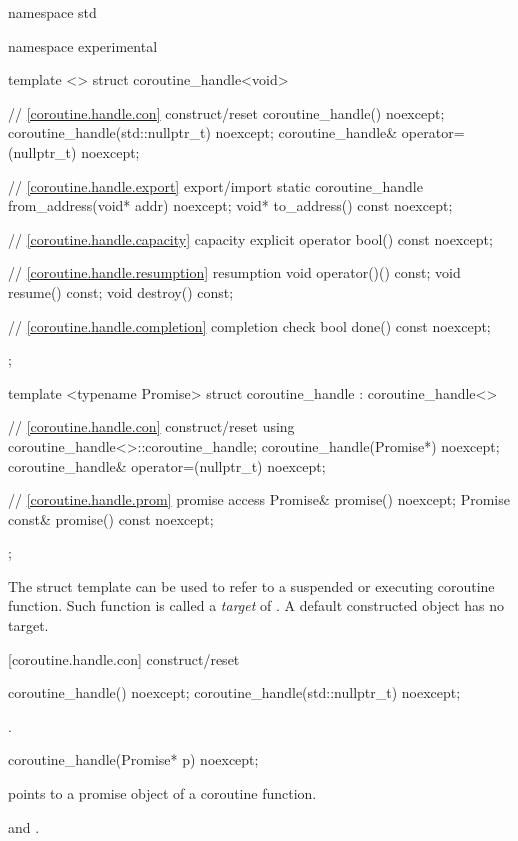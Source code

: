%
\begin{codeblock}
namespace std {
  namespace experimental {
    template <>
    struct coroutine_handle<void>
    {
      // \ref{coroutine.handle.con} construct/reset
      coroutine_handle() noexcept;		
      coroutine_handle(std::nullptr_t) noexcept;
      coroutine_handle& operator=(nullptr_t) noexcept;
      
      // \ref{coroutine.handle.export} export/import
      static coroutine_handle from_address(void* addr) noexcept;		
      void* to_address() const noexcept;
      
      // \ref{coroutine.handle.capacity} capacity
      explicit operator bool() const noexcept;
      
      // \ref{coroutine.handle.resumption} resumption
      void operator()() const;
      void resume() const;	
      void destroy() const;
      
      // \ref{coroutine.handle.completion} completion check
      bool done() const noexcept; 
    };
    
    template <typename Promise>
    struct coroutine_handle : coroutine_handle<>
    {
      // \ref{coroutine.handle.con} construct/reset
      using coroutine_handle<>::coroutine_handle;
      coroutine_handle(Promise*) noexcept;		
      coroutine_handle& operator=(nullptr_t) noexcept;
      
      // \ref{coroutine.handle.prom} promise access
      Promise& promise() noexcept;		
      Promise const& promise() const noexcept;
    };
  }
}
\end{codeblock}

\pnum
The struct template 
can be used to refer to a suspended or executing coroutine function.
Such function is called a \textit{target} of .
A default constructed  object has no target.


[coroutine.handle.con]{ construct/reset}
\begin{itemdecl}
  coroutine_handle() noexcept;		
  coroutine_handle(std::nullptr_t) noexcept;
\end{itemdecl}
\begin{itemdescr}
  \pnum\postconditions {}.
\end{itemdescr}

\begin{itemdecl}
  coroutine_handle(Promise* p) noexcept;	
\end{itemdecl}
\begin{itemdescr}
  \pnum
  \precondition {} points to a promise object of a coroutine function.
  
	\pnum
  \postconditions {} and .
\end{itemdescr}

